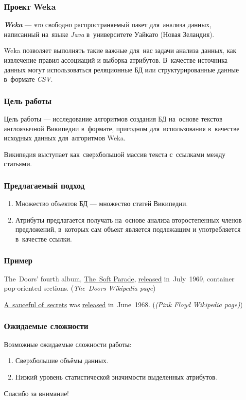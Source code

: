 \documentclass{beamer}
\newcommand{\MARK}[1]{{\bf {\it #1}}}
\begin{document}
\begin{frame}
\frametitle{Проект Weka}
\MARK{Weka} --- это свободно распространяемый пакет для~анализа данных, 
написанный на~языке {\it Java} в~университете Уайкато (Новая Зеландия).

\vspace{1cm}

Weka позволяет выполнять такие важные для~нас задачи анализа данных, 
как извлечение правил ассоциаций и выборка атрибутов.
В~качестве источника данных могут использоваться реляционные БД или структурированные данные в~формате {\it CSV}.
\end{frame}

\begin{frame}
\frametitle{Цель работы}
Цель работы --- исследование алгоритмов создания БД на~основе текстов англоязычной Википедии в~формате,
пригодном для~использования в~качестве исходных данных для~алгоритмов Weka.

\vspace{5mm}

Википедия выступает как~сверхбольшой массив текста с~ссылками между статьями.
\end{frame}

\begin{frame}
\frametitle{Предлагаемый подход}
\begin{enumerate}
\item{
Множество объектов БД --- множество статей Википедии.
}

\item {
Атрибуты предлагается получать на~основе анализа второстепенных членов предложений, 
в~которых сам объект является подлежащим и употребляется в~качестве ссылки.
}
\end{enumerate}
\end{frame}

\begin{frame}
\frametitle{Пример}
The~Doors' fourth album, \underline{The~Soft Parade}, 
\underline{released} in~July~1969, 
container pop-oriented sections. 
({\it The~Doors Wikipedia page})

\vspace{1cm}

\underline{A~sauceful of~secrets} was \underline{released} in~June~1968. 
({\it(Pink Floyd Wikipedia page)})
\end{frame}

\begin{frame}
\frametitle{Ожидаемые сложности}

Возможные ожидаемые сложности работы:

\begin{enumerate}

\item{
Сверхбольшие объёмы данных.
}

\item{
Низкий уровень статистической значимости выделенных атрибутов.
}

\end{enumerate}
\end{frame}

\begin{frame}
{\Large Спасибо за внимание!}
\end{frame}
\end{document}
